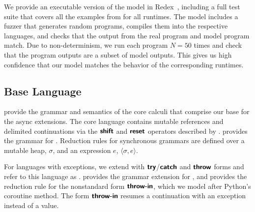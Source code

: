 We provide an executable version of the model in Redex~\cite{racket:redex}, including a full test suite that covers all the examples from  for all runtimes. The model includes a fuzzer that generates random programs, compiles them into the respective languages, and checks that the output from the real program and model program match. Due to non-determinism, we run each program $N=50$ times and check that the program outputs are a subset of model outputs. This gives us high confidence that our model matches the behavior of the corresponding runtimes.


\subsection{Base Language}

 provide the grammar and semantics of the core calculi that comprise our base for the async extensions. The core language \lc contains mutable references and delimited continuations via the $\text{\normalfont\textsf{\textbf{shift}}}$ and $\text{\normalfont\textsf{\textbf{reset}}}$ operators described by \citet{danvy_functional_nodate}.  provides the grammar for \lc. Reduction rules for synchronous grammars are defined over a mutable heap, $\sigma$, and an expression $e$, $\langle\sigma,e\rangle$.

For languages with exceptions, we extend \lc with $\text{\normalfont\textsf{\textbf{try}}}$/$\text{\normalfont\textsf{\textbf{catch}}}$ and $\text{\normalfont\textsf{\textbf{throw}}}$ forms and refer to this language as \exn.  provides the grammar extension for \exn, and  provides the reduction rule for the nonstandard form $\text{\normalfont\textsf{\textbf{throw-in}}}$, which we model after Python's  coroutine method. The form $\text{\normalfont\textsf{\textbf{throw-in}}}$ resumes a continuation with an exception instead of a value.

